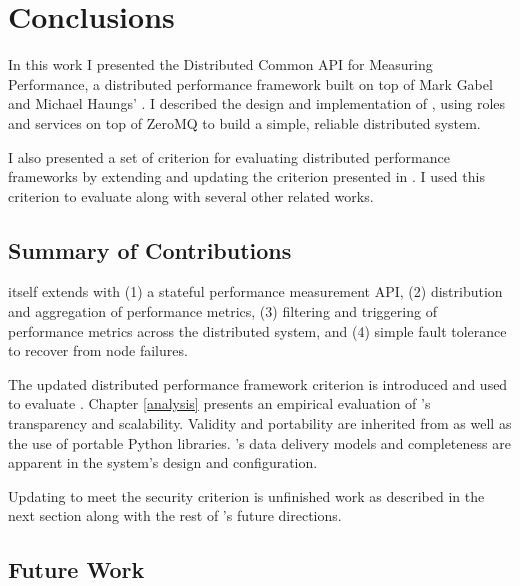 \chapter{Conclusions}
\label{conclusions}

In this work I presented the Distributed Common API for Measuring Performance, a distributed performance framework built
on top of Mark Gabel and Michael Haungs' \camp \cite{gabel2007}. I described the design and implementation of \dcampns,
using roles and services on top of ZeroMQ to build a simple, reliable distributed system.

I also presented a set of criterion for evaluating distributed performance frameworks by extending and updating the
criterion presented in \cite{zanikolas2005}. I used this criterion to evaluate \dcamp along with several other related
works.

\section{Summary of Contributions}

\dcamp itself extends \camp with (1) a stateful performance measurement API, (2) distribution and aggregation of
performance metrics, (3) filtering and triggering of performance metrics across the distributed system, and (4) simple
fault tolerance to recover from node failures.

The updated distributed performance framework criterion is introduced and used to evaluate \dcampns. Chapter
\ref{analysis} presents an empirical evaluation of \dcampns's transparency and scalability. Validity and portability are
inherited from \camp as well as the use of portable Python libraries. \dcampns's data delivery models and completeness
are apparent in the system's design and configuration.

Updating \dcamp to meet the security criterion is unfinished work as described in the next section along with the rest
of \dcampns's future directions.

\section{Future Work}
\label{future_work}

